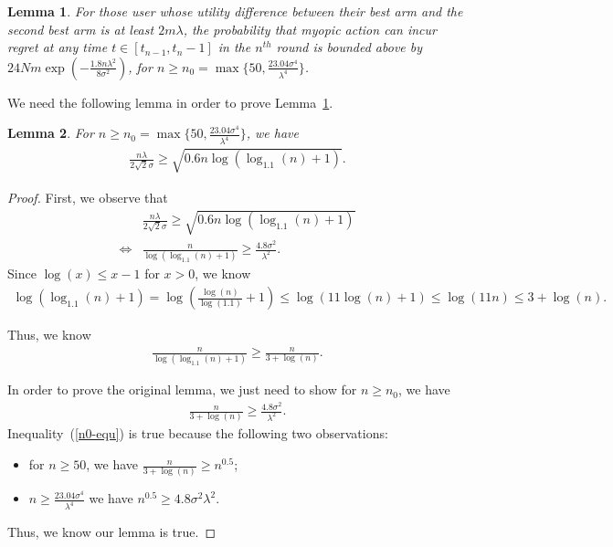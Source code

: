 \documentclass{article}
\newtheorem{lemma}{Lemma}
\begin{document}
\begin{lemma}
For those user whose utility difference between their best arm and the second best arm is at least $2m\lambda$, the probability that myopic action can incur regret at any time $t\in [t_{n-1},t_{n}-1]$ in the $n^{th}$ round is bounded above by $24Nm\exp\left(-\frac{1.8n\lambda^2}{8\sigma^2}\right)$, for $n\geq n_{0}=\max\{50, \frac{23.04\sigma^4}{\lambda^4}\}$.
\label{round:prob}
\end{lemma}


We need the following lemma in order to prove Lemma~\ref{round:prob}.

\begin{lemma}
For $n\geq n_{0}=\max\{50, \frac{23.04\sigma^4}{\lambda^4}\}$, we have
\begin{align}
\frac{n\lambda}{2\sqrt{2}\sigma}\geq \sqrt{0.6n\log(\log_{1.1}(n)+1)}. \nonumber
\end{align}
\label{n0-inequality}
\end{lemma}

\begin{proof}
First, we observe that
\begin{align}
&\frac{n\lambda}{2\sqrt{2}\sigma}\geq \sqrt{0.6n\log(\log_{1.1}(n)+1)} \nonumber \\
\iff &\frac{n}{\log(\log_{1.1}(n)+1)}\geq \frac{4.8\sigma^2}{\lambda^2}. \nonumber 
\end{align}
Since $\log(x)\leq x-1$ for $x>0$, we know 
\begin{align}
\log(\log_{1.1}(n)+1)=\log\left(\frac{\log(n)}{\log(1.1)}+1\right)\leq \log(11\log(n)+1)\leq \log(11n)\leq 3+\log(n). \nonumber
\end{align}

Thus, we know
\begin{align}
\frac{n}{\log(\log_{1.1}(n)+1)}\geq \frac{n}{3+\log(n)}. \nonumber 
\end{align}

In order to prove the original lemma, we just need to show for $n\geq n_{0}$, we have
\begin{align}
\frac{n}{3+\log(n)}\geq \frac{4.8\sigma^2}{\lambda^2}. \label{n0-equ}
\end{align}
Inequality~(\ref{n0-equ}) is true because the following two observations:
\begin{itemize}
\item for $n\geq 50$, we have $\frac{n}{3+\log(n)}\geq n^{0.5}$;
\item $n\geq \frac{23.04\sigma^4}{\lambda^4}$ we have $n^{0.5}\geq {4.8\sigma^{2}}{\lambda^{2}}$.
\end{itemize}

Thus, we know our lemma is true.

\end{proof}
\end{document}
